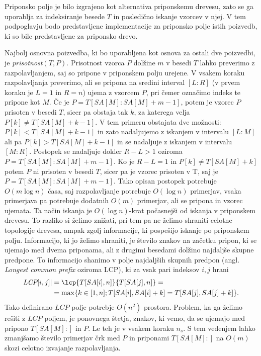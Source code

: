 Priponsko polje je bilo izgrajeno kot alternativa priponskemu drevesu, zato se ga uporablja za indeksiranje besede $T$ in posledično iskanje vzorcev v njej. V tem podpoglavju bodo predstavljene implementacije za priponsko polje istih poizvedb, ki so bile predstavljene za priponsko drevo.

Najbolj osnovna poizvedba, ki bo uporabljena kot osnova za ostali dve poizvedbi, je \textit{prisotnost}$(T,P)$. Prisotnost vzorca $P$ dolžine $m$ v besedi $T$ lahko preverimo z razpolavljanjem, saj so pripone v priponskem polju urejene. V vsakem koraku razpolavljanja preverimo, ali se pripona na sredini interval $[L:R]$ (v prvem koraku je $L=1$ in $R=n$) ujema z vzorcem $P$, pri čemer označimo indeks te pripone kot $M$. Če je $P=T[SA[M]:SA[M]+m-1]$, potem je vzorec $P$ prisoten v besedi $T$, sicer pa obstaja tak $k$, za katerega velja $P[k]\ne T[SA[M]+k-1]$. V tem primeru obstajata dve možnosti: $P[k]<T[SA[M]+k-1]$ in zato nadaljujemo z iskanjem v intervalu $[L:M]$ ali pa $P[k]>T[SA[M]+k-1]$ in se nadaljuje z iskanjem v intervalu $[M:R]$. Postopek se nadaljuje dokler $R-L>1$ oziroma $P=T[SA[M]:SA[M]+m-1]$. Ko je $R-L=1$ in $P[k]\ne T[SA[M]+k]$ potem $P$ ni prisoten v besedi $T$, sicer pa je vzorec prisoten v T, saj je $P=T[SA[M]:SA[M]+m-1]$. Tako opisan postopek potrebuje $O(m\log{n})$ časa, saj razpolavljanje potrebuje $O(\log{n})$ primerjav, vsaka primerjava pa potrebuje dodatnih $O(m)$ primerjav, ali se pripona in vzorec ujemata. Ta način iskanja je $O(\log{n})$-krat počasnejši od iskanja v priponskem drevesu. To razliko si želimo znižati, pri tem pa ne želimo shraniti celotne topologije drevesa, ampak zgolj informacije, ki pospešijo iskanje po priponskem polju. Informacijo, ki jo želimo shraniti, je število znakov na začetku pripon, ki se ujemajo med dvema priponama, ali z drugimi besedami dolžino najdaljše skupne predpone. To informacijo shanimo v polje najdaljših skupnih predpon (angl. \textit{Longest common prefix} oziroma LCP), ki za vsak pari indeksov $i,j$ hrani
    \begin{equation*} 
        \begin{split}
        \textit{LCP}[i,j]|&=\lcp{T[SA[i],n]}{T[SA[j],n]}=\\
         &=\max\{k\in[1,n];T[SA[i],SA[i]+k]=T[SA[j],SA[j]+k]\}.\\
        \end{split}
    \end{equation*}
Tako definirano $LCP$ polje potrebje $O(n^2)$ prostora. Problem, ka ga želimo rešiti z $LCP$ poljem, je ponovnega štetja, znakov, ki vemo, da se ujemajo med pripono $T[SA[M]:]$ in $P$. Le teh je v vsakem koraku $n_s$. S tem vedenjem lahko zmanjšamo število primerjav črk med $P$ in priponami $T[SA[M]:]$ na $O(m)$ skozi celotno izvajanje razpolavljanja. 

